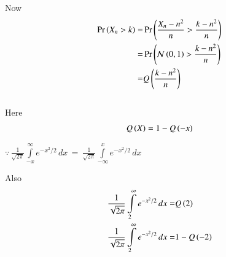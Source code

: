 \documentclass[journal,12pt,twocolumn]{IEEEtran}
\begin{document}
Now 
{
\begin{align}
    \Pr\left(X_n>k\right) =& \Pr\left(\frac{X_n-n^2}{n}>\frac{k-n^2}{n}\right)
    \\=& \Pr\left(\mathcal{N}\left(0,1\right)>\frac{k-n^2}{n}\right)
    \\ =& Q\left(\frac{k-n^2}{n}\right)
    \label{eq-cdf}
\end{align}
}
\vspace{0.2cm}
\\Here
\begin{align}
    Q\left(X\right)=1-Q\left(-x\right)
\end{align}
\begin{center}
    $\because \,{\frac{1}{\sqrt{2\pi}} \int \limits_{-x}^{\infty} e^{-x^2/2}\,dx}\,=\,{\frac{1}{\sqrt{2\pi}} \int \limits_{-\infty}^x e^{-x^2/2}\,dx}$
\end{center}
Also
\begin{align}
    \frac{1}{\sqrt{2\pi}} \int \limits_2^{\infty} e^{-x^2/2}\,dx=& Q\left(2\right)
    \\\frac{1}{\sqrt{2\pi}} \int \limits_2^{\infty} e^{-x^2/2}\,dx=&1-Q\left(-2\right)
\end{align}
\vspace{0.4cm}
\\
\end{document}
